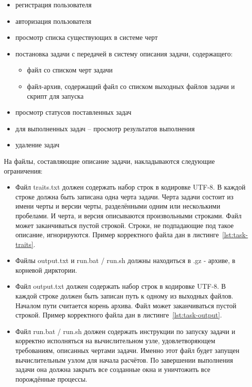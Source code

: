\documentclass[a4paper,12pt]{report}
\numberwithin{equation}{section}
\begin{document}
  \begin{itemize}
    \item регистрация пользователя
    \item авторизация пользователя
    \item просмотр списка существующих в системе черт
    \item постановка задачи с передачей в систему описания задачи, содержащего:
    \begin{itemize}
      \item файл со списком черт задачи
      \item файл-архив, содержащий файл со списком выходных файлов задачи и скрипт для запуска
    \end{itemize}
    \item просмотр статусов поставленных задач
    \item для выполненных задач -- просмотр результатов выполнения
    \item удаление задач
  \end{itemize}
  
  На файлы, составляющие описание задачи, накладываются следующие ограничения:
  
  \begin{itemize}
    \item Файл traits.txt должен содержать набор строк в кодировке UTF-8.
    В каждой строке должна быть записана одна черта задачи.
    Черта задачи состоит из имени черты и версии черты, разделёнными одним или несколькими пробелами. И черта, и версия описываются произвольными строками.
    Файл может заканчиваться пустой строкой.
    Строки, не подпадающие под такое описание, игнорируются.
    Пример корректного файла дан в листинге~\ref{lst:task-traits}.
    \item Файлы output.txt и run.bat / run.sh должны находиться в .gz - архиве, в корневой дирктории.
    \item Файл output.txt должен содержать набор строк в кодировке UTF-8.
    В каждой строке должен быть записан путь к одному из выходных файлов.
    Началом пути считается корень архива.
    Файл может заканчиваться пустой строкой.
    Пример корректного файла дан в листинге~\ref{lst:task-output}.
    \item Файл run.bat / run.sh должен содержать инструкции по запуску задачи и корректно исполняться на вычислительном узле, удовлетворяющем требованиям, описанных чертами задачи.
    Именно этот файл будет запущен вычислительным узлом для начала расчётов.
    По завершении выполнения задачи она должна закрыть все созданные окна и уничтожить все порождённые процессы.
  \end{itemize}
  
\end{document}

